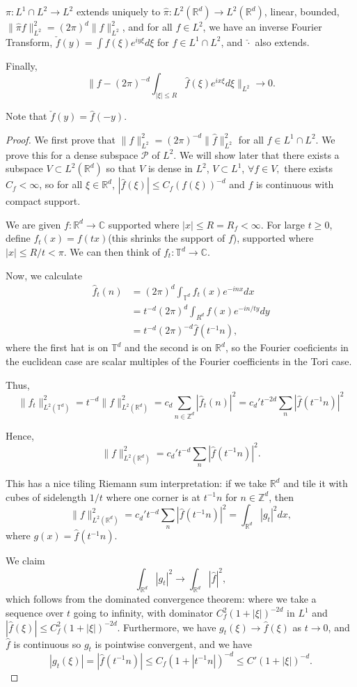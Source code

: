 \documentclass[11pt]{scrartcl}
\newcommand{\Z}{\mathbb{Z}}
\newcommand{\R}{\mathbb{R}}
\newcommand{\C}{\mathbb C}
\newcommand{\T}{\mathbb T}
\let \hat \widehat
\newcommand{\<}{\langle}
\renewcommand{\>}{\rangle}
\begin{document}
\begin{thm} $\pi: L^1\cap L^2 \rightarrow L^2$ extends uniquely to $\hat{\pi}: L^2(\R^d) \rightarrow L^2(\R^d)$, linear, bounded, 
$\|\hat{\pi}f\|_{L^2}^2 = (2\pi)^d\|f\|_{L^2}^2$,
and for all $f \in L^2$, we have an inverse Fourier Transform,
$\check{f}(y) = \int f(\xi)e^{iy\xi}d\xi$ for $f \in L^1 \cap L^2$, and $\check{\cdot}$ also extends.  

Finally, $$\|f - (2\pi)^{-d}\int_{|\xi| \le R} \hat{f}(\xi)e^{ix\xi}d\xi\|_{L^2} \rightarrow 0.$$
\end{thm}
Note that $\check{f}(y) = \hat{f}(-y)$.
\begin{proof}
We first prove that $\|f\|_{L^2}^2 = (2\pi)^{-d}\|\hat{f}\|_{L^2}^2$ for all $f \in L^1 \cap L^2$.  We prove this for a dense subspace $\mathscr{P} $ of $L^2$.  We will show later that there exists a subspace $V \subset L^2(\R^d)$ so that $V$ is dense in $L^2$, $V \subset L^1$, $\forall f \in V,$ there exists $C_f < \infty$, so for all $\xi \in \R^d$, $|\hat{f}(\xi)| \le C_f(f(\xi))^{-d}$ and $f$ is continuous with compact support.

We are given $f: \R^d \rightarrow \C$ supported where $|x |\le R = R_f < \infty$.  For large $t \ge 0$, define $f_t(x) = f(tx)$(this shrinks the support of $f$), supported where $|x| \le R/t < \pi$.  We can then think of $f_t: \T^d \rightarrow \C$.  

Now, we calculate
\begin{align*}
\hat{f}_{t}(n) & = (2\pi)^d\int_{\T^d} f_t(x)e^{-inx}dx\\
&= t^{-d}(2\pi)^d \int_{R^d} f(x)e^{-in/ty}dy \\
&= t^{-d} (2\pi)^{-d}\hat{f}(t^{-1}n),
\end{align*}
where the first hat is on $\T^d$ and the second is on $\R^d$, so the Fourier coeficients in the euclidean case are scalar multiples of the Fourier coefficients in the Tori case.  

Thus,
$$\|f_t\|_{L^2(\T^d)}^2 = t^{-d}\|f\|_{L^2(\R^d)}^2 = c_d\sum_{n \in \Z^d}|\hat{f}_t(n)|^2 = c_d't^{-2d}\sum_{n} |\hat{f}(t^{-1}n)|^2$$

Hence,
$$\|f\|_{L^2(\R^d)}^2 = c_d't^{-d}\sum_{n} |\hat{f}(t^{-1}n)|^2.$$

This has a nice tiling Riemann sum interpretation: if we take $\R^d$ and tile it with cubes of sidelength $1/t$ where one corner is at $t^{-1}n$ for $n \in \Z^d$, then
$$\|f\|_{L^2(\R^d)}^2 = c_d' t^{-d}\sum_{n}\left |\hat{f}(t^{-1}n)\right |^2 = \int_{\R^d}|g_t|^2 dx,$$
where $g(x) = \hat{f}(t^{-1}n)$.
 
We claim 
$$\int_{\R^d}|g_t|^2 \rightarrow \int_{\R^d}|\hat{f}|^2,$$
which follows from the dominated convergence theorem:  where we take a sequence over $t$ going to infinity, with dominator $C_f^2(1 + |\xi|)^{-2d}$ in $L^1$ and $|\hat{f}(\xi)| \le C_f^2(1 + |\xi|)^{-2d}$. Furthermore, we have $g_t(\xi) \rightarrow \hat{f}(\xi)$ as $t \rightarrow 0$, and $\hat{f}$ is continuous so $g_t$ is pointwise convergent, and we have
$$|g_t(\xi)| = |\hat{f}(t^{-1}n)| \le C_f(1 + |t^{-1}n|)^{-d} \le C'(1 + |\xi|)^{-d}.$$
\end{proof}
\newpage
\end{document}
